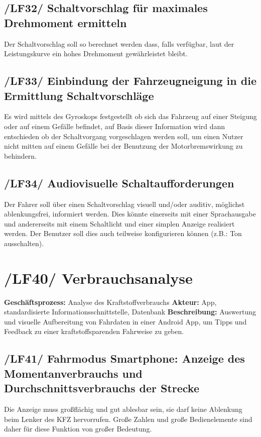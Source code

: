 \subsection{/LF32/ Schaltvorschlag für maximales Drehmoment ermitteln}
\nextline
Der Schaltvorschlag soll so berechnet werden dass, falls verfügbar, laut der Leistungskurve ein hohes Drehmoment gewährleistet bleibt. 

\subsection{/LF33/ Einbindung der Fahrzeugneigung in die Ermittlung Schaltvorschläge }
\nextline
Es wird mittels des Gyroskops festgestellt ob sich das Fahrzeug auf einer Steigung oder auf einem Gefälle befindet, auf Basis dieser Information wird dann entschieden ob der Schaltvorgang vorgeschlagen werden soll, um einen Nutzer nicht mitten auf einem Gefälle bei der Benutzung der Motorbremswirkung zu behindern.

\subsection{/LF34/ Audiovisuelle Schaltaufforderungen}
\nextline
Der Fahrer soll über einen Schaltvorschlag visuell und/oder auditiv, möglichst ablenkungsfrei, informiert werden. Dies könnte einerseits mit einer Sprachausgabe und andererseits mit einem Schaltlicht und einer simplen Anzeige realisiert werden. Der Benutzer soll dies auch teilweise konfigurieren können (z.B.: Ton ausschalten).

\newpage
\section{/LF40/ Verbrauchsanalyse}
\textbf{Geschäftsprozess:}	Analyse des Kraftstoffverbrauchs
\textbf{Akteur:}			App, standardisierte Informationsschnittstelle, Datenbank
\textbf{Beschreibung:}	Auswertung und visuelle Aufbereitung von Fahrdaten in einer Android App, um Tipps und Feedback zu einer kraftstoffsparenden Fahrweise zu geben.

\subsection{/LF41/ Fahrmodus Smartphone: Anzeige des Momentanverbrauchs und Durchschnittsverbrauchs der Strecke}
\nextline
Die Anzeige muss großflächig und gut ablesbar sein, sie darf keine Ablenkung beim Lenker des KFZ hervorrufen. 
Große Zahlen und große Bedienelemente sind daher für diese Funktion von großer Bedeutung.

